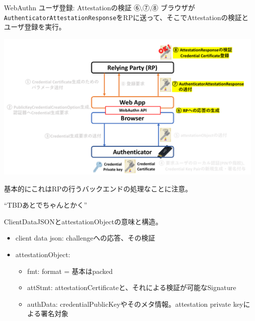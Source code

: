 \documentclass[12pt,dvipdfmx,uplatex]{beamer}
\begin{document}
\begin{frame}{WebAuthn ユーザ登録: Attestationの検証}
⑥,⑦,⑧ ブラウザが\texttt{AuthenticatorAttestationResponse}をRPに送って、そこでAttestationの検証とユーザ登録を実行。
\begin{center}
\includegraphics[width=0.9\linewidth]{Figs/webauthn-registration4.pdf}
\end{center}
\alert{基本的にこれはRPの行うバックエンドの処理なことに注意}。
\end{frame}

\begin{frame}

``TBDあとでちゃんとかく''

 ClientDataJSONとattestationObjectの意味と構造。

\begin{itemize}
 \item client data json: challengeへの応答、その検証
 \item attestationObject:
\begin{itemize}
 \item fmt: format = 基本はpacked
 \item attStmt: attestationCertificateと、それによる検証が可能なSignature
 \item authData: credentialPublicKeyやそのメタ情報。attestation private keyによる署名対象
\end{itemize}
\end{itemize}
\end{frame}
\end{document}
